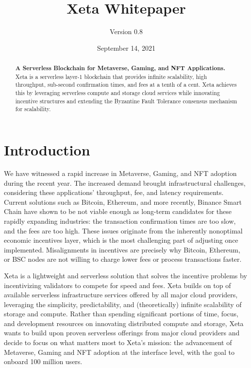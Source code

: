 \documentclass{article}
\title{Xeta Whitepaper}
\author{Version 0.8}
\date{September 14, 2021}
\begin{document}
\maketitle

\begin{abstract}
\textbf{A Serverless Blockchain for Metaverse, Gaming, and NFT Applications.} Xeta is a serverless layer-1 blockchain that provides infinite scalability, high throughput, sub-second confirmation times, and fees at a tenth of a cent. Xeta achieves this by leveraging serverless compute and storage cloud services while innovating incentive structures and extending the Byzantine Fault Tolerance consensus mechanism for scalability.
\end{abstract}

\section{Introduction}

We have witnessed a rapid increase in Metaverse, Gaming, and NFT adoption during the recent year. The increased demand brought infrastructural challenges, considering these applications' throughput, fee, and latency requirements. Current solutions such as Bitcoin, Ethereum, and more recently, Binance Smart Chain have shown to be not viable enough as long-term candidates for these rapidly expanding industries: the transaction confirmation times are too slow, and the fees are too high. These issues originate from the inherently nonoptimal economic incentives layer, which is the most challenging part of adjusting once implemented. Misalignments in incentives are precisely why Bitcoin, Ethereum, or BSC nodes are not willing to charge lower fees or process transactions faster.
\bigskip

Xeta is a lightweight and serverless solution that solves the incentive problems by incentivizing validators to compete for speed and fees. Xeta builds on top of available serverless infrastructure services offered by all major cloud providers, leveraging the simplicity, predictability, and (theoretically) infinite scalability of storage and compute. Rather than spending significant portions of time, focus, and development resources on innovating distributed compute and storage, Xeta wants to build upon proven serverless offerings from major cloud providers and decide to focus on what matters most to Xeta's mission: the advancement of Metaverse, Gaming and NFT adoption at the interface level, with the goal to onboard 100 million users.
\bigskip
\end{document}
